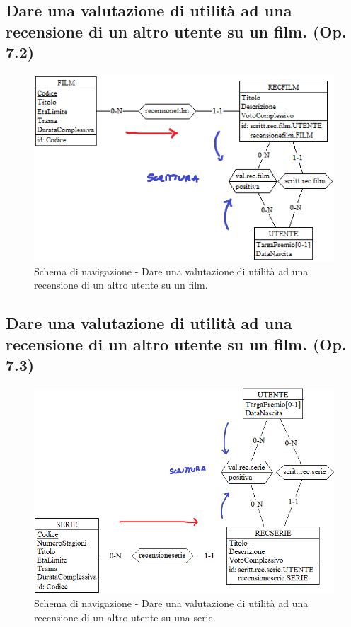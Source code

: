 \documentclass[a4paper,12pt]{report}
\begin{document}
	\subsection{Dare una valutazione di utilità ad una recensione di un altro utente su un film. (Op. 7.2)}
	\begin{figure}[H]
		\centering
		\includegraphics[width=450pt]{ER/navigazione/valutazionerecfilm.png}
		\caption{Schema di navigazione - Dare una valutazione di utilità ad una recensione di un altro utente su un film.}
	\end{figure}
	
	\subsection{Dare una valutazione di utilità ad una recensione di un altro utente su un film. (Op. 7.3)}
	\begin{figure}[H]
		\centering
		\includegraphics[width=450pt]{ER/navigazione/valutazionerecserie.png}
		\caption{Schema di navigazione - Dare una valutazione di utilità ad una recensione di un altro utente su una serie.}
	\end{figure}
	
\end{document}
